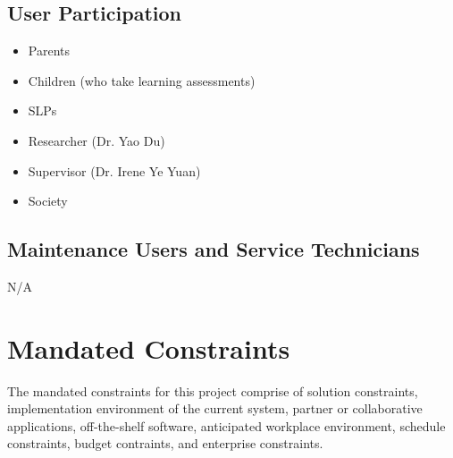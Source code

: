 \documentclass[12pt]{article}
\begin{document}
\subsection{User Participation}
\begin{itemize}
  \item Parents
  \item Children (who take learning assessments)
  \item SLPs
  \item Researcher (Dr. Yao Du)
  \item Supervisor (Dr. Irene Ye Yuan)
  \item Society
\end{itemize}

\subsection{Maintenance Users and Service Technicians}
N/A\\

\newpage

\section{Mandated Constraints}
\hspace{2em}The mandated constraints for this project comprise of solution constraints, implementation environment of the current system, partner or collaborative applications,
off-the-shelf software, anticipated workplace environment, schedule constraints, budget contraints, and enterprise constraints.
\end{document}
